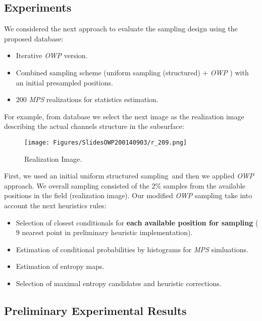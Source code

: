 \subsection{Experiments}

We considered the next approach to evaluate the sampling design using the proposed database: \

\begin{itemize}
\item Iterative \emph{OWP} version.
\item Combined sampling scheme (uniform sampling (structured) + \emph{OWP} ) with an initial presampled positions.
\item $200$ \emph{MPS} realizations for statistics estimation.
\end{itemize}

For example, from database we select the next image as the realization image describing the actual channels structure in the subsurface:


\begin{figure}[ht!]
    \centering
    \texttt{[image: Figures/SlidesOWP200140903/r\_209.png]}
	\caption{\label{fig:groundtruth} Realization Image. }
 \end{figure}

First, we used an initial uniform structured sampling\footnotemark \ and then we applied \emph{OWP} approach. We overall sampling consisted of the $2\%$ samples from the available positions in the field (realization image). Our modified \emph{OWP} sampling take into account the next heuristics rules: 

\begin{itemize}
\item \small Selection of closest conditionals for \textbf{each available position for sampling} ($9$ nearest point in preliminary heuristic implementation).
\item \small Estimation of conditional probabilities by histograms for \emph{MPS} simluations.
\item \small Estimation of entropy maps.
\item \small Selection of maximal entropy candidates and heuristic corrections.
\end{itemize}


\subsection{Preliminary Experimental Results}\label{sec_exp_OWP}

